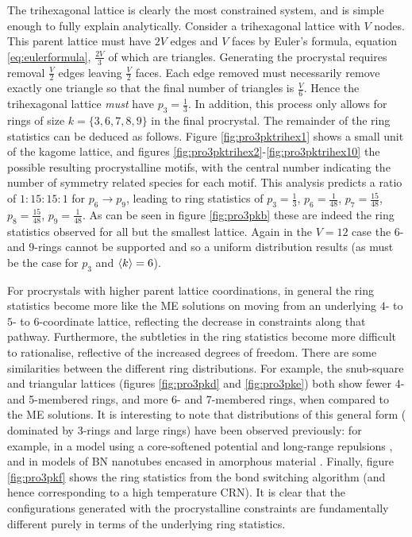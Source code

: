 The trihexagonal lattice is clearly the most constrained system, and is simple enough to fully explain analytically.
Consider a trihexagonal lattice with $V$ nodes. 
This parent lattice must have $2V$ edges and $V$ faces by Euler's formula, equation \eqref{eq:eulerformula}, $\frac{2V}{3}$ of which are triangles.
Generating the procrystal requires removal $\frac{V}{2}$ edges leaving $\frac{V}{2}$ faces.
Each edge removed must necessarily remove exactly one triangle so that the final number of triangles is $\frac{V}{6}$.
Hence the trihexagonal lattice \textit{must} have $p_3=\frac{1}{3}$.
In addition, this process only allows for rings of size $k=\{3,6,7,8,9\}$ in the final procrystal.
The remainder of the ring statistics can be deduced as follows.
Figure \ref{fig:pro3pktrihex1} shows a small unit of the kagome lattice, and figures \ref{fig:pro3pktrihex2}\--\ref{fig:pro3pktrihex10} the possible resulting procrystalline motifs, with the central number indicating the number of symmetry related species for each motif. 
This analysis predicts a ratio of $1:15:15:1$ for $p_6\rightarrow p_9$, leading to ring statistics of $p_3=\frac{1}{3}$, $p_6=\frac{1}{48}$, $p_7=\frac{15}{48}$, $p_8=\frac{15}{48}$, $p_9=\frac{1}{48}$.
As can be seen in figure \ref{fig:pro3pkb} these are indeed the ring statistics observed for all but the smallest lattice.
Again in the $V=12$ case the $6$\-- and $9$\--rings cannot be supported and so a uniform distribution results (as must be the case for $p_3$ and $\langle k \rangle=6$). 

For procrystals with higher parent lattice coordinations, in general the ring statistics become more like the ME solutions on moving from an underlying $4$\-- to $5$\-- to $6$\--coordinate lattice, reflecting the decrease in constraints along that pathway.
Furthermore, the subtleties in the ring statistics become more difficult to rationalise, reflective of the increased degrees of freedom.
There are some similarities between the different ring distributions.
For example, the snub\--square and triangular lattices (figures \ref{fig:pro3pkd} and \ref{fig:pro3pke}) both show
fewer 4\-- and 5\--membered rings, and more 6\-- and 7\--membered rings, when compared to the ME solutions.
It is interesting to note that distributions of this general form (\ie{} dominated by 3\--rings and large rings) have been observed previously: for example, in a model using a core-softened potential and long-range repulsions \cite{Camp2003}, and in models of BN nanotubes encased in amorphous material \cite{Griebel2007}.
Finally, figure \ref{fig:pro3pkf} shows the ring statistics from the bond switching algorithm (and hence corresponding to a high temperature CRN). 
It is clear that the configurations generated with the procrystalline constraints are fundamentally different purely in terms of the underlying ring statistics.


